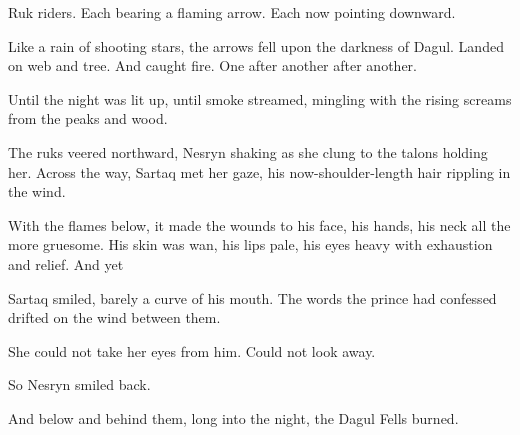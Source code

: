 Ruk riders. Each bearing a flaming arrow. Each now pointing downward.

Like a rain of shooting stars, the arrows fell upon the darkness of Dagul. Landed on web and tree. And caught fire. One after another after another.

Until the night was lit up, until smoke streamed, mingling with the rising screams from the peaks and wood.

The ruks veered northward, Nesryn shaking as she clung to the talons holding her. Across the way, Sartaq met her gaze, his now-shoulder-length hair rippling in the wind.

With the flames below, it made the wounds to his face, his hands, his neck all the more gruesome. His skin was wan, his lips pale, his eyes heavy with exhaustion and relief. And yet 

Sartaq smiled, barely a curve of his mouth. The words the prince had confessed drifted on the wind between them.

She could not take her eyes from him. Could not look away.

So Nesryn smiled back.

And below and behind them, long into the night, the Dagul Fells burned.

